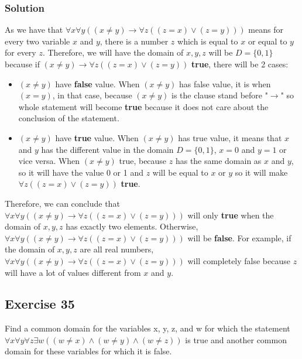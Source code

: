 \documentclass{article}
\begin{document}
\subsubsection*{Solution}
As we have that $\forall x\forall y((x \ne y) \rightarrow \forall z((z = x) \lor (z = y)))$ means for every two variable $x$ and $y$, there is a number $z$ which is equal to $x$ or equal to $y$ for every $z$. Therefore, we will have the domain of $x, y, z$ will be $D = \{0, 1\}$ because if $(x \ne y) \rightarrow \forall z((z = x) \lor (z = y))$ \textbf{true}, there will be 2 cases:
\begin{itemize}
    \item $(x \ne y)$ have \textbf{false} value. When $(x \ne y)$ has false value, it is when $(x = y)$, in that case, because $(x \ne y)$ is the clause stand before "$\rightarrow$" so whole statement will become \textbf{true} because it does not care about the conclusion of the statement.
    \item $(x \ne y)$ have \textbf{true} value. When $(x \ne y)$ has true value, it means that $x$ and $y$ has the different value in the domain $D = \{0, 1\}$, $x = 0$ and $y = 1$ or vice versa. When $(x \ne y)$ true, because $z$ has the same domain as $x$ and $y$, so it will have the value 0 or 1 and $z$ will be equal to $x$ or $y$ so it will make $\forall z((z = x) \lor (z = y))$ \textbf{true}.
\end{itemize}

Therefore, we can conclude that $\forall x\forall y((x \ne y) \rightarrow \forall z((z = x) \lor (z = y)))$ will only \textbf{true} when the domain of $x, y, z$ has exactly two elements. Otherwise, $\forall x\forall y((x \ne y) \rightarrow \forall z((z = x) \lor (z = y)))$ will be \textbf{false}. For example, if the domain of $x, y ,z$ are all real numbers, $\forall x\forall y((x \ne y) \rightarrow \forall z((z = x) \lor (z = y)))$ will completely false because $z$ will have a lot of values different from $x$ and $y$.
\subsection*{Exercise 35}
Find a common domain for the variables x, y, z, and w for which the statement $\forall x\forall y\forall z\exists w((w\ne x) \land (w \ne y) \land (w \ne z))$ is true and another common domain for these variables for which it is false.
\end{document}
